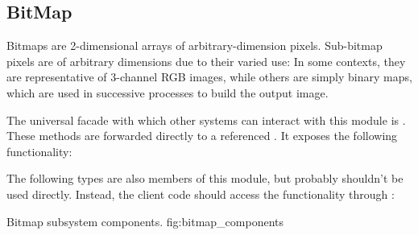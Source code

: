 \newcommand{\bitmaparea}[4]{
    \index{#1}
    \pbodyitem{#2}{
        \textbf{Pixel Dimensions:} {#3} \newline
        {#4}
    }
}

\subsection{BitMap}
Bitmaps are 2-dimensional arrays of arbitrary-dimension pixels.
Sub-bitmap pixels are of arbitrary dimensions due to their varied use: In some contexts, they are representative of 3-channel RGB images, while others are simply binary maps, which are used in successive processes to build the output image.

The universal facade with which other systems can interact with this module is \bmftype.
These methods are forwarded directly to a referenced \bmctype.
It exposes the following functionality:
\begin{itemize}
\end{itemize}

The following types are also members of this module, but probably shouldn't be used directly.  Instead, the client code should access the functionality through \bmftype:
\begin{itemize}
\end{itemize}

{Bitmap subsystem components.}
{fig:bitmap_components}


